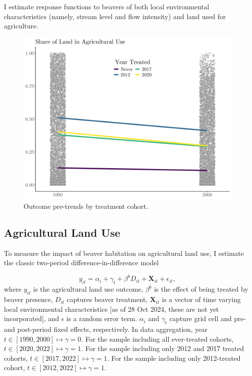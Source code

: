 I estimate response functions to beavers of both local environmental characteristics (namely, stream level and flow intensity) and land used for agriculture.

\begin{figure}
    \centering
    \includegraphics[width=0.7\linewidth]{output/figures/outcome_pretrends.png}
    \caption{Outcome pre-trends by treatment cohort.}
    \label{fig:outcome-pretrends}
\end{figure}

\subsection{Agricultural Land Use}

To measure the impact of beaver habitation on agricultural land use, I estimate the classic two-period difference-in-difference model

\begin{equation} \label{eq:main_beaver_eq}
y_{it} = \alpha_i + \gamma_t + \beta^{b}D_{it} + \mathbf{X}_{it} + \epsilon_{it},
\end{equation}
where $y_{it}$ is the agricultural land use outcome, $\beta^b$ is the effect of being treated by beaver presence, $D_{it}$ captures beaver treatment, $\mathbf{X}_{it}$ is a vector of time varying local environmental characteristics [as of 28 Oct 2024, these are not yet incorporated], and $\epsilon$ is a random error term. $\alpha_i$ and $\gamma_t$ capture grid cell and pre-and post-period fixed effects, respectively. In data aggregation, year $t \in [1990, 2000] \mapsto \gamma = 0$. For the sample including all ever-treated cohorts, $t \in [2020, 2022] \mapsto \gamma = 1$. For the sample including only 2012 and 2017 treated cohorts, $t \in [2017, 2022] \mapsto \gamma = 1$. For the sample including only 2012-treated cohort, $t \in [2012, 2022] \mapsto \gamma = 1$.